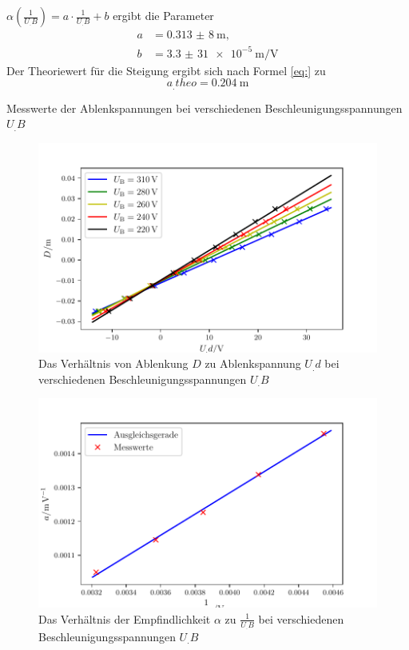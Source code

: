 $\alpha\left(\frac{1}{U_.B}\right)=a\cdot\frac{1}{U_.B}+b$
ergibt die Parameter
\begin{align*}
a&=\SI{0,313(8)}{\metre},\\
b&=\SI{3,3(31)e-5}{\metre\per\volt}
\end{align*}
Der Theoriewert für die Steigung ergibt sich nach Formel \eqref{eq:} zu
\[
a_.{theo}=\SI{0,204}{\metre}
\]
\begin{table}
\centering
\caption{Messwerte der Ablenkspannungen bei verschiedenen Beschleunigungsspannungen $U_.B$}

\label{tab:Elek}
\end{table}
\begin{figure}
\centering
\includegraphics[width=\linewidth-70pt,height=\textheight-70pt,keepaspectratio]{content/images/GraphElek.pdf}
\caption{Das Verhältnis von Ablenkung $D$ zu Ablenkspannung $U_.d$ bei verschiedenen Beschleunigungsspannungen $U_.B$}\label{fig:Elek}
\end{figure}
\begin{figure}
\centering
\includegraphics[width=\linewidth-70pt,height=\textheight-70pt,keepaspectratio]{content/images/GraphElek6.pdf}
\caption{Das Verhältnis der Empfindlichkeit $\alpha$ zu $\frac{1}{U_.B}$ bei verschiedenen Beschleunigungsspannungen $U_.B$}\label{fig:Elek2}
\end{figure}


